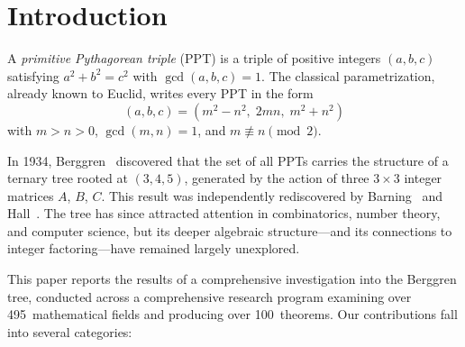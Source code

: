 \documentclass[12pt]{amsart}
\theoremstyle{definition}
\theoremstyle{remark}
\begin{document}
\maketitle


\section{Introduction}\label{sec:intro}

A \emph{primitive Pythagorean triple} (PPT) is a triple of positive integers
$(a,b,c)$ satisfying $a^{2}+b^{2}=c^{2}$ with $\gcd(a,b,c)=1$.  The classical
parametrization, already known to Euclid, writes every PPT in the form
\[
  (a,b,c) = (m^{2}-n^{2},\;2mn,\;m^{2}+n^{2})
\]
with $m>n>0$, $\gcd(m,n)=1$, and $m\not\equiv n\pmod{2}$.

In 1934, Berggren~\cite{Berggren1934} discovered that the set of all PPTs
carries the structure of a ternary tree rooted at $(3,4,5)$, generated by the
action of three $3\times3$ integer matrices $A$, $B$, $C$.  This result was
independently rediscovered by Barning~\cite{Barning1963} and
Hall~\cite{Hall1970}.  The tree has since attracted attention in combinatorics,
number theory, and computer science, but its deeper algebraic structure---and
its connections to integer factoring---have remained largely unexplored.

This paper reports the results of a comprehensive investigation into the
Berggren tree, conducted across a comprehensive research program examining
over 495~mathematical fields and producing over 100~theorems.  Our contributions
fall into several categories:
\end{document}
